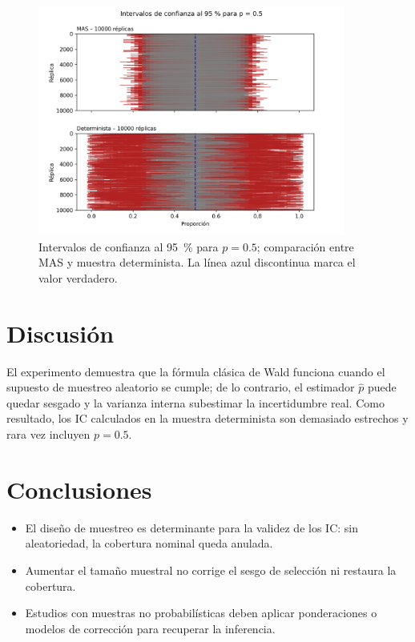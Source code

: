 \documentclass[11pt,a4paper]{article}
\begin{document}
\begin{figure}[H]
  \centering
  \includegraphics[width=0.9\textwidth]{intervalos_ic.png}
  \caption{Intervalos de confianza al 95~\% para $p=0.5$; comparación entre MAS y muestra determinista. La línea azul discontinua marca el valor verdadero.}
  \label{fig:intervalos}
\end{figure}

\section{Discusión}
El experimento demuestra que la fórmula clásica de Wald funciona cuando el supuesto de muestreo aleatorio se cumple; de lo contrario, el estimador $\hat p$ puede quedar sesgado y la varianza interna subestimar la incertidumbre real. Como resultado, los IC calculados en la muestra determinista son demasiado estrechos y rara vez incluyen $p=0.5$.

\section{Conclusiones}
\begin{itemize}
  \item El diseño de muestreo es determinante para la validez de los IC: sin aleatoriedad, la cobertura nominal queda anulada.
  \item Aumentar el tamaño muestral no corrige el sesgo de selección ni restaura la cobertura.  
  \item Estudios con muestras no probabilísticas deben aplicar ponderaciones o modelos de corrección para recuperar la inferencia.
\end{itemize}
\end{document}
